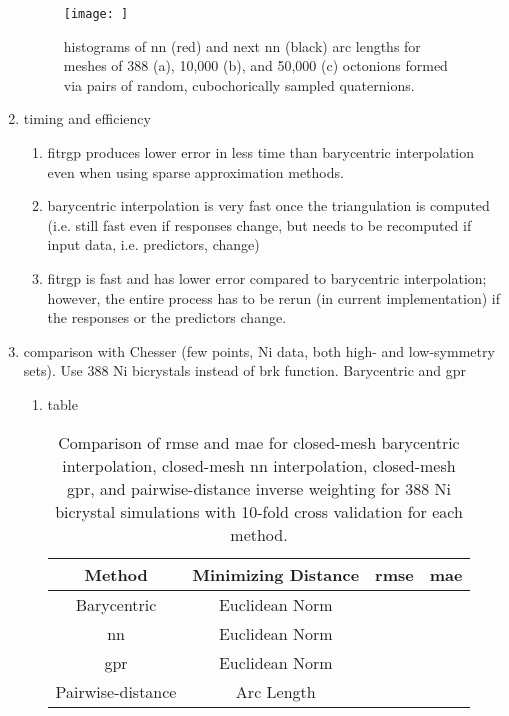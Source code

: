 \begin{enumerate}
    \begin{figure}
        \centering
        \texttt{[image: ]}
        \caption{histograms of \acrfull{nn} (red) and next \acrlong{nn} (black) arc lengths for meshes of 388 (a), 10,000 (b), and 50,000 (c) octonions formed via pairs of random, cubochorically sampled quaternions.}
        \label{fig:nndist}
    \end{figure}
    \item timing and efficiency
    \begin{enumerate}
        \item fitrgp produces lower error in less time than barycentric interpolation even when using sparse approximation methods.
        \item barycentric interpolation is very fast once the triangulation is computed (i.e. still fast even if responses change, but needs to be recomputed if input data, i.e. predictors, change)
        \item fitrgp is fast and has lower error compared to barycentric interpolation; however, the entire process has to be rerun (in current implementation) if the responses or the predictors change.
    \end{enumerate}
    \item comparison with Chesser \cite{Chesser2020LearningProperties} (few points, Ni data, both high- and low-symmetry sets). Use 388 Ni bicrystals instead of \gls{brk} function. Barycentric and \gls{gpr}
    \begin{enumerate}
        \item table
        \begin{table}[]
            \centering
            \begin{tabular}{c c c c}
                \hline
                 Method & Minimizing Distance & \acrshort{rmse} & \acrshort{mae} \\
                 \hline
                 Barycentric & Euclidean Norm & & \\
                 \acrshort{nn} & Euclidean Norm & & \\
                 \acrshort{gpr} & Euclidean Norm & & \\
                 Pairwise-distance & Arc Length & &
            \end{tabular}
            \caption{Comparison of \acrfull{rmse} and \acrfull{mae} for closed-mesh barycentric interpolation, closed-mesh \acrfull{nn} interpolation, closed-mesh \acrfull{gpr}, and pairwise-distance inverse weighting for 388 Ni bicrystal simulations with 10-fold cross validation for each method.}

\end{table}
\end{enumerate}
\end{enumerate}
